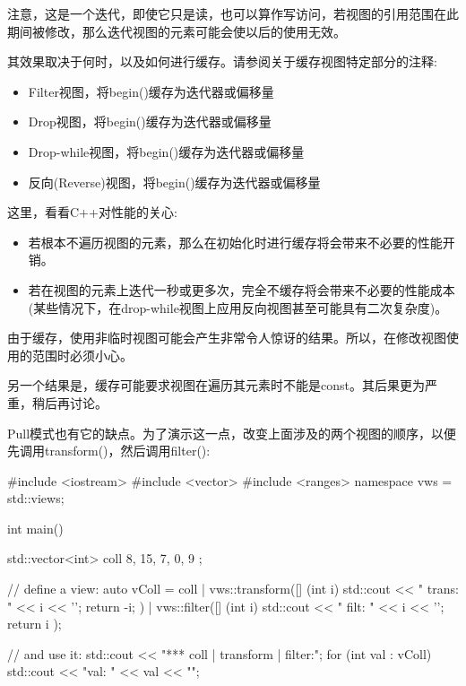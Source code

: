 注意，这是一个迭代，即使它只是读，也可以算作写访问，若视图的引用范围在此期间被修改，那么迭代视图的元素可能会使以后的使用无效。

其效果取决于何时，以及如何进行缓存。请参阅关于缓存视图特定部分的注释:

\begin{itemize}
\item
Filter视图，将begin()缓存为迭代器或偏移量

\item
Drop视图，将begin()缓存为迭代器或偏移量

\item
Drop-while视图，将begin()缓存为迭代器或偏移量

\item
反向(Reverse)视图，将begin()缓存为迭代器或偏移量
\end{itemize}

这里，看看C++对性能的关心:

\begin{itemize}
\item
若根本不遍历视图的元素，那么在初始化时进行缓存将会带来不必要的性能开销。

\item
若在视图的元素上迭代一秒或更多次，完全不缓存将会带来不必要的性能成本(某些情况下，在drop-while视图上应用反向视图甚至可能具有二次复杂度)。
\end{itemize}

由于缓存，使用非临时视图可能会产生非常令人惊讶的结果。所以，在修改视图使用的范围时必须小心。

另一个结果是，缓存可能要求视图在遍历其元素时不能是const。其后果更为严重，稍后再讨论。


Pull模式也有它的缺点。为了演示这一点，改变上面涉及的两个视图的顺序，以便先调用transform()，然后调用filter():


\begin{cpp}
#include <iostream>
#include <vector>
#include <ranges>
namespace vws = std::views;

int main()
{
	std::vector<int> coll{ 8, 15, 7, 0, 9 };
	
	// define a view:
	auto vColl = coll
	| vws::transform([] (int i) {
		std::cout << " trans: " << i << '\n';
		return -i;
	})
	| vws::filter([] (int i) {
		std::cout << " filt: " << i << '\n';
		return i %
	});
	
	// and use it:
	std::cout << "*** coll | transform | filter:\n";
	for (int val : vColl) {
	std::cout << "val: " << val << "\n\n";
	}
}
\end{cpp}


